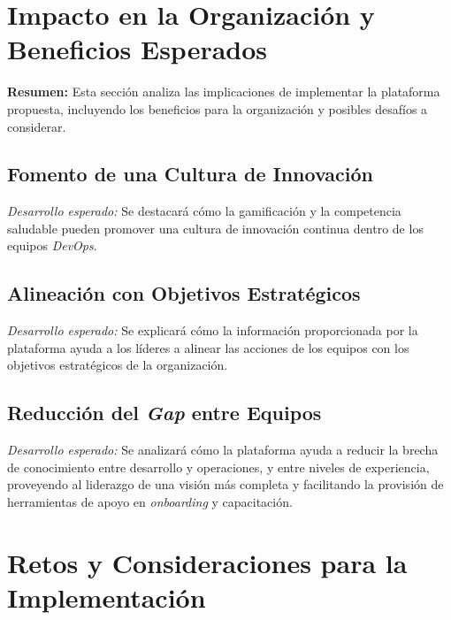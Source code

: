 \documentclass[journal]{IEEEtran}
\begin{document}
\section{\textbf{\Large Impacto en la Organización y Beneficios Esperados}}

\textbf{Resumen:} Esta sección analiza las implicaciones de implementar la plataforma propuesta, incluyendo los beneficios para la organización y posibles desafíos a considerar.

\subsection{\textbf{Fomento de una Cultura de Innovación}}

\textit{Desarrollo esperado:} Se destacará cómo la gamificación y la competencia saludable pueden promover una cultura de innovación continua dentro de los equipos \textit{DevOps}.

\subsection{\textbf{Alineación con Objetivos Estratégicos}}

\textit{Desarrollo esperado:} Se explicará cómo la información proporcionada por la plataforma ayuda a los líderes a alinear las acciones de los equipos con los objetivos estratégicos de la organización.

\subsection{\textbf{Reducción del \textit{Gap} entre Equipos}}

\textit{Desarrollo esperado:} Se analizará cómo la plataforma ayuda a reducir la brecha de conocimiento entre desarrollo y operaciones, y entre niveles de experiencia, proveyendo al liderazgo de una visión más completa y facilitando la provisión de herramientas de apoyo en \textit{onboarding} y capacitación.

\section{\textbf{\Large Retos y Consideraciones para la Implementación}}
\end{document}
